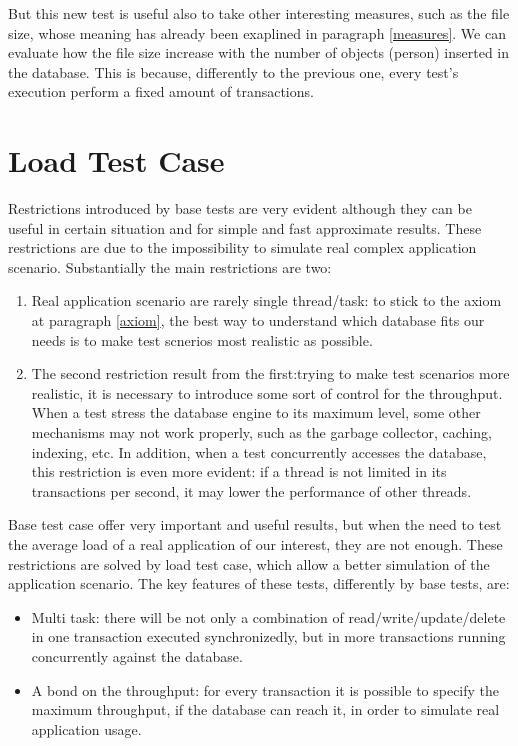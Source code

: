 But this new test is useful also to take other interesting measures, such as the file size, whose meaning has already been exaplined in paragraph \ref{measures}. We can evaluate how the file size increase with the number of objects (person) inserted in the database. This is because, differently to the previous one, every test's execution perform a fixed amount of transactions. 

	\section{Load Test Case}
Restrictions introduced by base tests are very evident although they can be useful in certain situation and for simple and fast approximate results. These restrictions are due to the impossibility to simulate real complex application scenario. Substantially the main restrictions are two:
\begin{enumerate}
	\item Real application scenario are rarely single thread/task: to stick to the axiom at paragraph \ref{axiom}, the best way to understand which database fits our needs is to make test scnerios most realistic as possible.
	\item The second restriction result from the first:trying to make test scenarios more realistic, it is necessary to introduce some sort of control for the throughput. When a test stress the database engine to its maximum level, some other mechanisms may not work properly, such as the garbage collector, caching, indexing, etc. In addition, when a test concurrently accesses the database, this restriction is even more evident: if a thread is not limited in its transactions per second, it may lower the performance of other threads.
\end{enumerate}

Base test case offer very important and useful results, but when the need to test the average load of a real application of our interest, they are not enough. These restrictions are solved by load test case, which allow a better simulation of the application scenario. The key features of these tests, differently by base tests, are:
\begin{itemize}
	\item Multi task: there will be not only a combination of read/write/update/delete in one transaction executed synchronizedly, but in more transactions running concurrently against the database.
	\item A bond on the throughput: for every transaction it is possible to specify the maximum throughput, if the database can reach it, in order to simulate real application usage.
\end{itemize}

